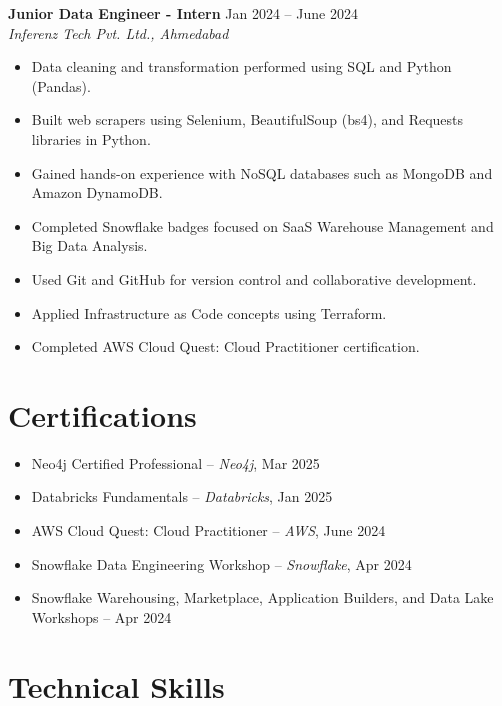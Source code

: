 \documentclass[11pt,a4paper]{article}
\begin{document}
\vspace{0.4cm}

\textbf{Junior Data Engineer - Intern} \hfill Jan 2024 – June 2024 \\
\textit{Inferenz Tech Pvt. Ltd., Ahmedabad} 
\begin{itemize}
  \item Data cleaning and transformation performed using SQL and Python (Pandas).
  \item Built web scrapers using Selenium, BeautifulSoup (bs4), and Requests libraries in Python.
  \item Gained hands-on experience with NoSQL databases such as MongoDB and Amazon DynamoDB.
  \item Completed Snowflake badges focused on SaaS Warehouse Management and Big Data Analysis.
  \item Used Git and GitHub for version control and collaborative development.
  \item Applied Infrastructure as Code concepts using Terraform.
  \item Completed AWS Cloud Quest: Cloud Practitioner certification.
\end{itemize}

\vspace{0.4cm}

\section*{Certifications}

\begin{itemize}
  \item Neo4j Certified Professional – \textit{Neo4j}, Mar 2025
  \item Databricks Fundamentals – \textit{Databricks}, Jan 2025
  \item AWS Cloud Quest: Cloud Practitioner – \textit{AWS}, June 2024
  \item Snowflake Data Engineering Workshop – \textit{Snowflake}, Apr 2024
  \item Snowflake Warehousing, Marketplace, Application Builders, and Data Lake Workshops – Apr 2024
\end{itemize}

\vspace{0.4cm}

\section*{Technical Skills}
\end{document}
